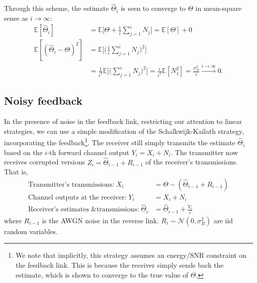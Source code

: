 \documentclass[letterpaper, 10pt, conference]{ieeeconf}
\begin{document}
Through this scheme, the estimate $\widehat{\Theta}_{i}$ is seen to converge to $\Theta$ in mean-square sense as $i\rightarrow\infty$:
\begin{align*}
	\mathbb{E}[\widehat{\Theta}_{i}] &= \mathbb{E}\bigg[\Theta+\frac{1}{i}\sum_{j=1}^{i}N_{j}\bigg] = \mathbb{E}[\Theta]+0 \\
	\mathbb{E}[(\widehat{\Theta}_{i}-\Theta)^{2}] &= \mathbb{E}\bigg[\bigg(\frac{1}{i}\sum_{j=1}^{i}N_{j}\bigg)^{2}\bigg] \\
												  &= \frac{1}{i^{2}}\mathbb{E}\bigg[\bigg(\sum_{j=1}^{i}N_{j}\bigg)^{2}\bigg] = \frac{i}{i^{2}}\mathbb{E}[N_{1}^{2}] = \frac{\sigma_{N}^{2}}{i}\overset{i\to\infty}\longrightarrow 0.
\end{align*}


\subsection{Noisy feedback}
\label{sec:sk-noisy}

In the presence of noise in the feedback link, restricting our attention to linear strategies, we can use a simple modification of the Schalkwijk-Kailath strategy, incorporating the feedback\footnote{We note that implicitly, this strategy assumes an energy/SNR constraint on the feedback link. This is because the receiver simply sends back the estimate, which is shown to converge to the true value of $\Theta$.}. The receiver still simply transmits the estimate $\widehat{\Theta}_i$ based on the $i$-th forward channel output $Y_i=X_i+N_i$. The transmitter now receives corrupted versions $Z_i=\widehat\Theta_{i-1} + R_{i-1}$ of the receiver's transmissions. That is,
\begin{align*}
	\text{Transmitter's transmissions:}\;X_i &= \Theta - (\widehat\Theta_{i-1} + R_{i-1}) \\
	\text{Channel outputs at the receiver:}\;	Y_i &= X_i + N_i \\
	\text{Receiver's estimates \& transmissions:}\;	\widehat\Theta_i &= \widehat\Theta_{i-1} + \frac{Y_i}{i}
\end{align*}
where $R_{i-1}$ is the AWGN noise in the reverse link. $R_i \sim \mathcal{N}(0, \sigma_R^2)$ are iid random variables.
\end{document}
